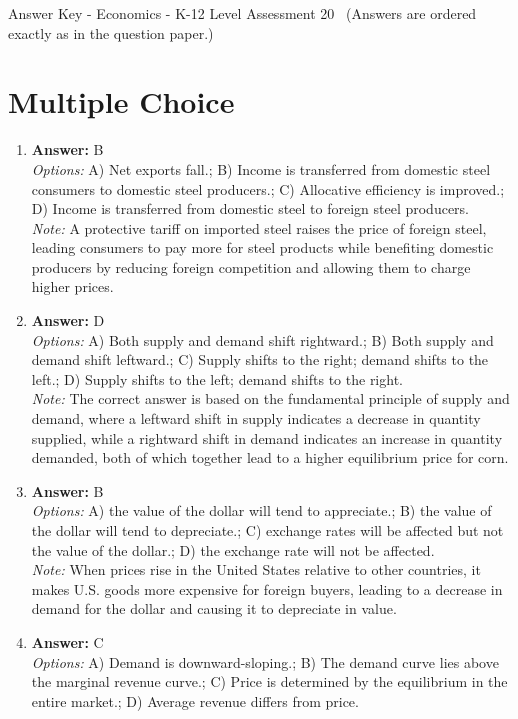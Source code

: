 \documentclass[12pt]{article}
\begin{document}
\begin{center}
Answer Key - Economics - K-12 Level Assessment 20 \
\small (Answers are ordered exactly as in the question paper.)
\end{center}

\section*{Multiple Choice}
\begin{enumerate}[label=\arabic*.]
\item \textbf{Answer:} B
\\ \textit{Options:} A) Net exports fall.; B) Income is transferred from domestic steel consumers to domestic steel producers.; C) Allocative efficiency is improved.; D) Income is transferred from domestic steel to foreign steel producers.
\\ \textit{Note:} A protective tariff on imported steel raises the price of foreign steel, leading consumers to pay more for steel products while benefiting domestic producers by reducing foreign competition and allowing them to charge higher prices.
\item \textbf{Answer:} D
\\ \textit{Options:} A) Both supply and demand shift rightward.; B) Both supply and demand shift leftward.; C) Supply shifts to the right; demand shifts to the left.; D) Supply shifts to the left; demand shifts to the right.
\\ \textit{Note:} The correct answer is based on the fundamental principle of supply and demand, where a leftward shift in supply indicates a decrease in quantity supplied, while a rightward shift in demand indicates an increase in quantity demanded, both of which together lead to a higher equilibrium price for corn.
\item \textbf{Answer:} B
\\ \textit{Options:} A) the value of the dollar will tend to appreciate.; B) the value of the dollar will tend to depreciate.; C) exchange rates will be affected but not the value of the dollar.; D) the exchange rate will not be affected.
\\ \textit{Note:} When prices rise in the United States relative to other countries, it makes U.S. goods more expensive for foreign buyers, leading to a decrease in demand for the dollar and causing it to depreciate in value.
\item \textbf{Answer:} C
\\ \textit{Options:} A) Demand is downward-sloping.; B) The demand curve lies above the marginal revenue curve.; C) Price is determined by the equilibrium in the entire market.; D) Average revenue differs from price.

\end{enumerate}
\end{document}
